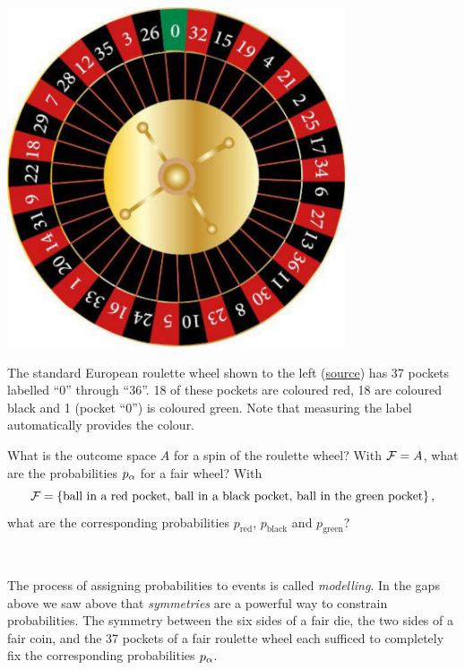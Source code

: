 \newpage %
\begin{minipage}{0.4\textwidth}
  \includegraphics[width=0.75\textwidth]{figs/unit01_roulette.pdf}
\end{minipage}%
\begin{minipage}{0.5\textwidth}
  The standard European roulette wheel shown to the left (\href{https://www.vecteezy.com/vector-art/658761-casino-roulette-wheel}{source}) has 37 pockets labelled ``0'' through ``36''.
  18 of these pockets are coloured red, 18 are coloured black and 1 (pocket ``0'') is coloured green.
  Note that measuring the label automatically provides the colour.
\end{minipage}

\noindent What is the outcome space $A$ for a spin of the roulette wheel?
With $\mathcal F = A$, what are the probabilities $p_{\alpha}$ for a fair wheel?
With
\begin{equation*}
  \mathcal F = \left\{\mbox{ball in a red pocket, ball in a black pocket, ball in the green pocket}\right\},
\end{equation*}
what are the corresponding probabilities $p_{\text{red}}$, $p_{\text{black}}$ and $p_{\text{green}}$?
\begin{mdframed}
  \ \\[100 pt]
\end{mdframed}

The process of assigning probabilities to events is called \textit{modelling}.
In the gaps above we saw above that \textit{symmetries} are a powerful way to constrain probabilities.
The symmetry between the six sides of a fair die, the two sides of a fair coin, and the 37 pockets of a fair roulette wheel each sufficed to completely fix the corresponding probabilities $p_{\alpha}$.

